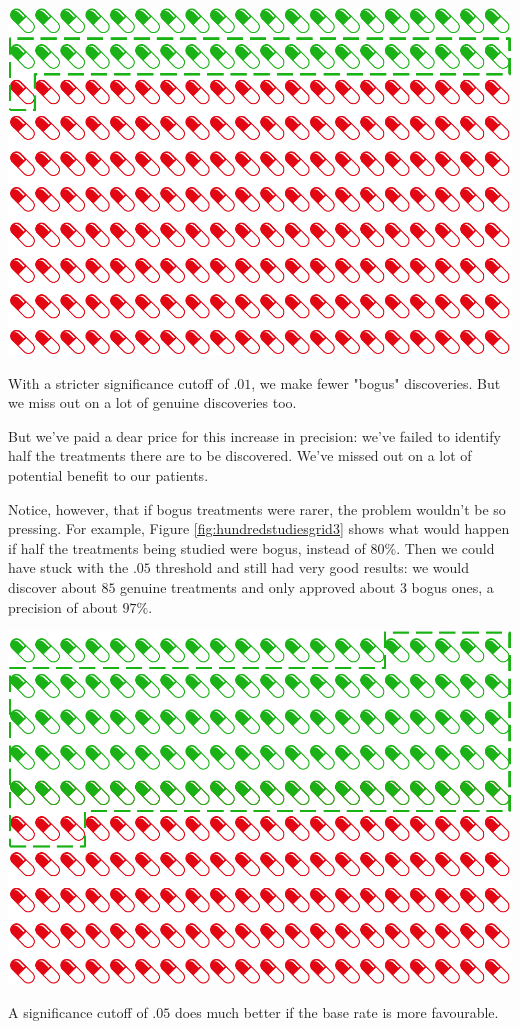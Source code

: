 \documentclass[justified]{tufte-book}
\theoremstyle{definition}
\theoremstyle{definition}
\theoremstyle{definition}
\theoremstyle{definition}
\theoremstyle{remark}
\begin{document}
\begin{marginfigure}
\includegraphics{_main_files/figure-latex/hundredstudiesgrid2-1} \caption[With a stricter significance cutoff of $.01$, we make fewer "bogus" discoveries]{With a stricter significance cutoff of $.01$, we make fewer "bogus" discoveries. But we miss out on a lot of genuine discoveries too.}\label{fig:hundredstudiesgrid2}
\end{marginfigure}

But we've paid a dear price for this increase in precision: we've failed to identify half the treatments there are to be discovered. We've missed out on a lot of potential benefit to our patients.

Notice, however, that if bogus treatments were rarer, the problem wouldn't be so pressing. For example, Figure \ref{fig:hundredstudiesgrid3} shows what would happen if half the treatments being studied were bogus, instead of \(80\%\). Then we could have stuck with the \(.05\) threshold and still had very good results: we would discover about \(85\) genuine treatments and only approved about \(3\) bogus ones, a precision of about \(97\%\).

\begin{marginfigure}
\includegraphics{_main_files/figure-latex/hundredstudiesgrid3-1} \caption[A significance cutoff of $.05$ does much better if the base rate is more favourable]{A significance cutoff of $.05$ does much better if the base rate is more favourable.}\label{fig:hundredstudiesgrid3}
\end{marginfigure}
\end{document}
